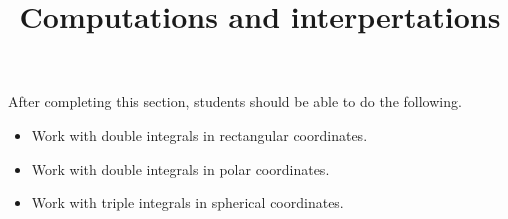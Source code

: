 \documentclass{ximera}
\title{Computations and interpertations}
\begin{document}
\begin{abstract}
\end{abstract}
\maketitle

\begin{sectionOutcomes}

After completing this section, students should be able to do the following.

\begin{itemize}
\item Work with double integrals in rectangular coordinates.
\item Work with double integrals in polar coordinates.
\item Work with triple integrals in spherical coordinates.
\end{itemize}

\end{sectionOutcomes}
\end{document}
